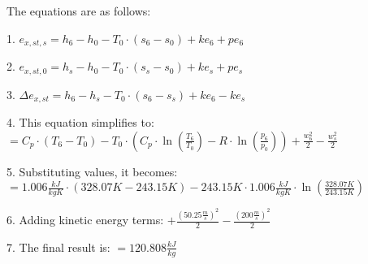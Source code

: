The equations are as follows:

1. \( e_{x,st,s} = h_6 - h_0 - T_0 \cdot (s_6 - s_0) + ke_6 + pe_6 \)

2. \( e_{x,st,0} = h_s - h_0 - T_0 \cdot (s_s - s_0) + ke_s + pe_s \)

3. \( \Delta e_{x,st} = h_6 - h_s - T_0 \cdot (s_6 - s_s) + ke_6 - ke_s \)

4. This equation simplifies to:
   \( = C_p \cdot (T_6 - T_0) - T_0 \cdot (C_p \cdot \ln \left( \frac{T_6}{T_0} \right) - R \cdot \ln \left( \frac{p_6}{p_0} \right)) + \frac{w_6^2}{2} - \frac{w_s^2}{2} \)

5. Substituting values, it becomes:
   \( = 1.006 \frac{kJ}{kgK} \cdot (328.07K - 243.15K) - 243.15K \cdot 1.006 \frac{kJ}{kgK} \cdot \ln \left( \frac{328.07K}{243.15K} \right) \)

6. Adding kinetic energy terms:
   \( + \frac{(50.25 \frac{m}{s})^2}{2} - \frac{(200 \frac{m}{s})^2}{2} \)

7. The final result is:
   \( = 120.808 \frac{kJ}{kg} \)